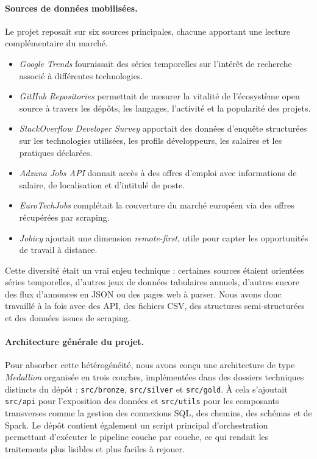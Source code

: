 \documentclass{article}
\begin{document}
\paragraph{Sources de données mobilisées.}
Le projet reposait sur six sources principales, chacune apportant une lecture
complémentaire du marché.
\begin{itemize}
    \item \textit{Google Trends} fournissait des séries temporelles sur l'intérêt de recherche associé à différentes technologies.
    \item \textit{GitHub Repositories} permettait de mesurer la vitalité de l'écosystème open source à travers les dépôts, les langages, l'activité et la popularité des projets.
    \item \textit{StackOverflow Developer Survey} apportait des données d'enquête structurées sur les technologies utilisées, les profils développeurs, les salaires et les pratiques déclarées.
    \item \textit{Adzuna Jobs API} donnait accès à des offres d'emploi avec informations de salaire, de localisation et d'intitulé de poste.
    \item \textit{EuroTechJobs} complétait la couverture du marché européen via des offres récupérées par scraping.
    \item \textit{Jobicy} ajoutait une dimension \textit{remote-first}, utile pour capter les opportunités de travail à distance.
\end{itemize}
Cette diversité était un vrai enjeu technique : certaines sources étaient orientées
séries temporelles, d'autres jeux de données tabulaires annuels, d'autres encore
des flux d'annonces en JSON ou des pages web à parser. Nous avons donc travaillé à
la fois avec des API, des fichiers CSV, des structures semi-structurées et des
données issues de scraping.

\paragraph{Architecture générale du projet.}
Pour absorber cette hétérogénéité, nous avons conçu une architecture de type
\textit{Medallion} organisée en trois couches, implémentées dans des dossiers
techniques distincts du dépôt : \texttt{src/bronze}, \texttt{src/silver} et
\texttt{src/gold}. À cela s'ajoutait \texttt{src/api} pour l'exposition des
données et \texttt{src/utils} pour les composants transverses comme la gestion des
connexions SQL, des chemins, des schémas et de Spark. Le dépôt contient également
un script principal d'orchestration permettant d'exécuter le pipeline couche par
couche, ce qui rendait les traitements plus lisibles et plus faciles à rejouer.
\end{document}
